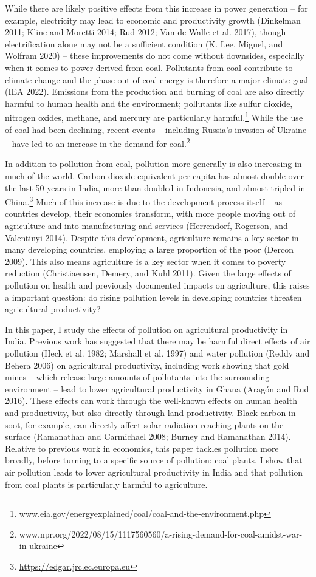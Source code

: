 \documentclass[
]{article}
\begin{document}
While there are likely positive effects from this increase in power generation -- for example, electricity may lead to economic and productivity growth (Dinkelman 2011; Kline and Moretti 2014; Rud 2012; Van de Walle et al. 2017), though electrification alone may not be a sufficient condition (K. Lee, Miguel, and Wolfram 2020) -- these improvements do not come without downsides, especially when it comes to power derived from coal. Pollutants from coal contribute to climate change and the phase out of coal energy is therefore a major climate goal (IEA 2022). Emissions from the production and burning of coal are also directly harmful to human health and the environment; pollutants like sulfur dioxide, nitrogen oxides, methane, and mercury are particularly harmful.\footnote{www.eia.gov/energyexplained/coal/coal-and-the-environment.php} While the use of coal had been declining, recent events -- including Russia's invasion of Ukraine -- have led to an increase in the demand for coal.\footnote{www.npr.org/2022/08/15/1117560560/a-rising-demand-for-coal-amidst-war-in-ukraine}

In addition to pollution from coal, pollution more generally is also increasing in much of the world. Carbon dioxide equivalent per capita has almost double over the last 50 years in India, more than doubled in Indonesia, and almost tripled in China.\footnote{\url{https://edgar.jrc.ec.europa.eu}} Much of this increase is due to the development process itself -- as countries develop, their economies transform, with more people moving out of agriculture and into manufacturing and services (Herrendorf, Rogerson, and Valentinyi 2014). Despite this development, agriculture remains a key sector in many developing countries, employing a large proportion of the poor (Dercon 2009). This also means agriculture is a key sector when it comes to poverty reduction (Christiaensen, Demery, and Kuhl 2011). Given the large effects of pollution on health and previously documented impacts on agriculture, this raises a important question: do rising pollution levels in developing countries threaten agricultural productivity?

In this paper, I study the effects of pollution on agricultural productivity in India. Previous work has suggested that there may be harmful direct effects of air pollution (Heck et al. 1982; Marshall et al. 1997) and water pollution (Reddy and Behera 2006) on agricultural productivity, including work showing that gold mines -- which release large amounts of pollutants into the surrounding environment -- lead to lower agricultural productivity in Ghana (Aragón and Rud 2016). These effects can work through the well-known effects on human health and productivity, but also directly through land productivity. Black carbon in soot, for example, can directly affect solar radiation reaching plants on the surface (Ramanathan and Carmichael 2008; Burney and Ramanathan 2014). Relative to previous work in economics, this paper tackles pollution more broadly, before turning to a specific source of pollution: coal plants. I show that air pollution leads to lower agricultural productivity in India and that pollution from coal plants is particularly harmful to agriculture.
\end{document}
